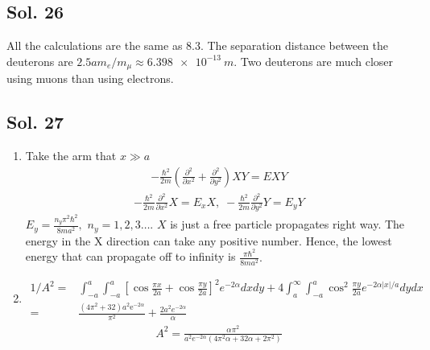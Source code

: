 \subsection*{Sol. 26}
All the calculations are the same as 8.3. The separation distance between the deuterons are $2.5am_e/m_{\mu}\approx \qty{6.398e-13}{m}.$ Two deuterons are much closer using muons than using electrons.

\subsection*{Sol. 27}
\begin{enumerate}
    \item 
    Take the arm that $x\gg a$
\begin{align*}
    -\frac{\hbar^2}{2m}
    \left(
    \frac{\partial^2}{\partial x^2}+
    \frac{\partial^2}{\partial y^2}
    \right)XY
    =EXY
\end{align*}
\begin{align*}
    -\frac{\hbar^2}{2m}
    \frac{\partial^2}{\partial x^2}
    X
    =E_xX,\;
    -\frac{\hbar^2}{2m}
    \frac{\partial^2}{\partial y^2}
    Y
    =E_yY
\end{align*}
$E_y=\frac{n_y\pi^2\hbar^2}{8ma^2},$ $n_y=1,2,3\dots.$ $X$ is just a free particle propagates right way. The energy in the X direction can take any positive number. Hence, the lowest energy that can propagate off to infinity is $\frac{\pi\hbar^2}{8ma^2}.$

\item 
\begin{align*}
    1/A^2 =& 
    \int_{-a}^a\int_{-a}^a 
    [\cos\frac{\pi x}{2a}+
    \cos\frac{\pi y}{2a}]^2e^{-2\alpha} dxdy
    +4
    \int_{a}^\infty\int_{-a}^a 
    \cos^2\frac{\pi y}{2a}
    e^{-2\alpha|x|/a} dydx\\
    =&
    \frac{\left(4\pi^{2} + 32\right) a^{2} \mathrm{e}^{-2{\alpha}}}{\pi^{2}} + 
    \frac{2 a^2e^{-2\alpha}}{\alpha}
\end{align*}
\begin{align*}
    A^2 = 
    \frac{\alpha\pi^2}
    {a^2e^{-2\alpha}(4\pi^2\alpha + 32\alpha + 2\pi^2)}
\end{align*}


\end{enumerate}
